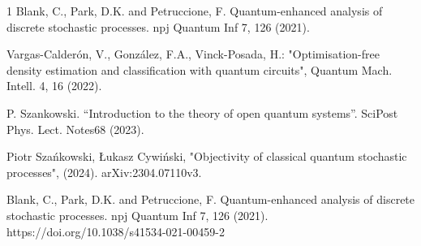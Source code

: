 \documentclass[journal,twocolumn]{IEEEtran}
\begin{document}
\begin{thebibliography}{1}
Blank, C., Park, D.K. and Petruccione, F. Quantum-enhanced analysis of discrete stochastic processes. npj Quantum Inf 7, 126 (2021).

Vargas-Calderón, V., González, F.A., Vinck-Posada, H.: "Optimisation-free density estimation and classification with quantum circuits", Quantum Mach. Intell. 4, 16 (2022).

P. Szankowski. “Introduction to the theory of open quantum systems”. SciPost Phys. Lect. Notes68 (2023).

Piotr Szańkowski, Łukasz Cywiński, "Objectivity of classical quantum stochastic processes", (2024). arXiv:2304.07110v3.

Blank, C., Park, D.K. and Petruccione, F. Quantum-enhanced analysis of discrete stochastic processes. npj Quantum Inf 7, 126 (2021). https://doi.org/10.1038/s41534-021-00459-2

\end{thebibliography}

 
  

 
\end{document}
